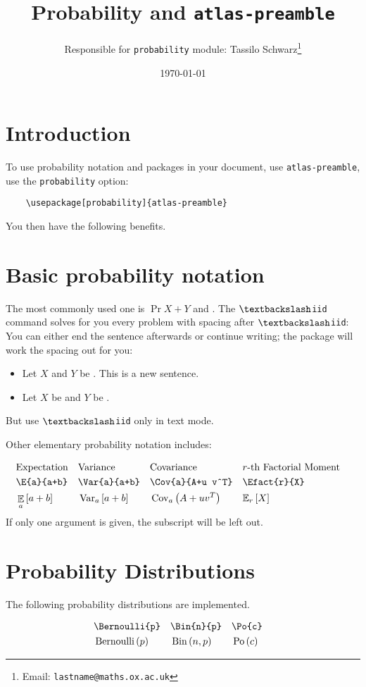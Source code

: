 \documentclass[11pt, a4paper]{article}
\title{Probability and \texttt{atlas-preamble}}
\author{Responsible for \texttt{probability} module: Tassilo Schwarz\footnote{Email: \texttt{lastname@maths.ox.ac.uk}}}
\date{\today}
\begin{document}
\maketitle


\section{Introduction}
To use probability notation and packages in your document, use \texttt{atlas-preamble}, use the \texttt{probability} option:
\begin{verbatim}
	\usepackage[probability]{atlas-preamble}
\end{verbatim}


\noindent
You then have the following benefits.




\section{Basic probability notation}
The most commonly used one is $\Pr{X+Y}$ and \iid. The \texttt{$\textbackslash$iid} command solves for you every problem with spacing after \texttt{$\textbackslash$iid}: You can either end the sentence afterwards or continue writing; the package will work the spacing out for you:
\begin{itemize}
	\item Let $X$ and $Y$ be \iid. This is a new sentence. 
	\item Let $X$ be \iid and $Y$ be \iid.
\end{itemize}

\noindent
But use \texttt{$\textbackslash$iid} only in text mode. 

\noindent Other elementary probability notation includes:

\begin{align*}
	&\text{Expectation}
	&&\text{Variance}
	&&\text{Covariance} 
	&& r\text{-th Factorial Moment} & \\
	&\texttt{\textbackslash E\{a\}\{a+b\}}
	&&\texttt{\textbackslash Var\{a\}\{a+b\}}
	&&\texttt{\textbackslash Cov\{a\}\{A+u v\^{}T\}} 
	&& \texttt{\textbackslash Efact\{r\}\{X\}} & \\
	&\E{a}{a+b} 
	&& \Var{a}{a+b}
	&& \Cov{a}{A+u v^T} 
	&& \Efact{r}{X} &
\end{align*}
If only one argument is given, the subscript will be left out.




\section{Probability Distributions}

The following probability distributions are implemented.

\begin{align*}
	&\texttt{\textbackslash Bernoulli\{p\}}
	&&\texttt{\textbackslash Bin\{n\}\{p\}}
	&&\texttt{\textbackslash Po\{c\}} &  \\
	&\operatorname{Bernoulli}\left( p \right) 
	&& \operatorname{Bin}\left( n, p \right)
	&& \operatorname{Po}\left( c \right) &
\end{align*}
\end{document}
